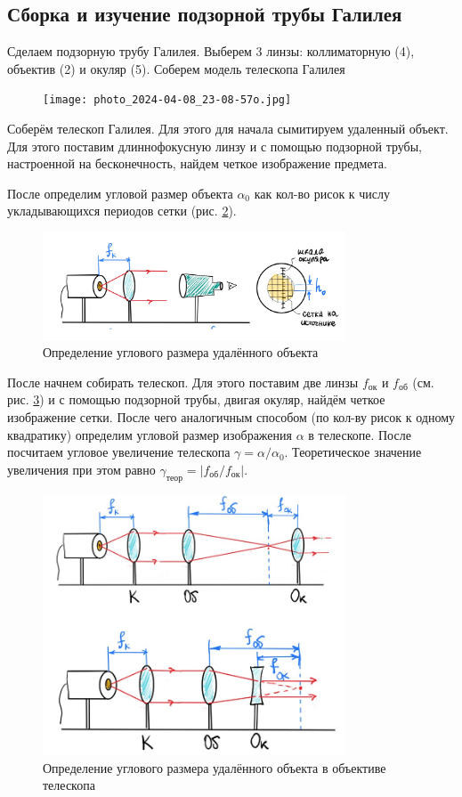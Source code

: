 \documentclass[a4paper,12pt]{article}
\theoremstyle{definition}
\begin{document}
\subsection{Сборка и изучение подзорной трубы Галилея}

Сделаем подзорную трубу Галилея. Выберем 3 линзы: коллиматорную (4), объектив (2) и окуляр (5). Соберем модель телескопа Галилея

\begin{figure}[h!]
    \centering
    \texttt{[image: photo\_2024-04-08\_23-08-57о.jpg]}
    \label{fig:vac}
\end{figure}

Соберём телескоп Галилея. Для этого для начала сымитируем удаленный объект. Для этого поставим длиннофокусную линзу и с помощью подзорной трубы, настроенной на бесконечность, найдем четкое изображение предмета.

После определим угловой размер объекта $\alpha_0$ как кол-во рисок к числу укладывающихся периодов сетки (рис. \ref{pic:6}).

\begin{figure}[h!]
    \centering
    \includegraphics[width=9cm]{6.jpg}
    \caption{Определение углового размера удалённого объекта}\label{pic:6}
\end{figure}
После начнем собирать телескоп. Для этого поставим две линзы $f_\text{ок}$ и $f_\text{об}$ (см. рис. \ref{pic:7}) и с помощью подзорной трубы, двигая окуляр, найдём четкое изображение сетки. После чего аналогичным способом (по кол-ву рисок к одному квадратику) определим угловой размер изображения $\alpha$ в телескопе. После посчитаем угловое увеличение телескопа $\gamma = \alpha / \alpha_0$. Теоретическое значение увеличения при этом равно $\gamma_\text{теор}= |f_\text{об} / f_\text{ок}|$.

\begin{figure}[h!]
    \centering
    \includegraphics[width=9cm]{7.jpg}
    \caption{Определение углового размера удалённого объекта в объективе телескопа}\label{pic:7}
\end{figure}
\end{document}
